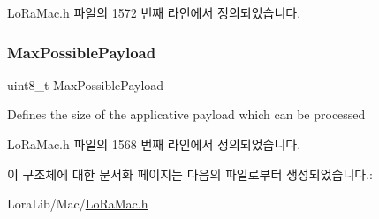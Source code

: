 Lo\+Ra\+Mac.\+h 파일의 1572 번째 라인에서 정의되었습니다.

\mbox{\label{structs_lo_ra_mac_tx_info_aa2c8329cf5f4dd8fe4b1563a40a3f642}} 
\subsubsection{\texorpdfstring{Max\+Possible\+Payload}{MaxPossiblePayload}}
{\footnotesize\ttfamily uint8\+\_\+t Max\+Possible\+Payload}

Defines the size of the applicative payload which can be processed 

Lo\+Ra\+Mac.\+h 파일의 1568 번째 라인에서 정의되었습니다.



이 구조체에 대한 문서화 페이지는 다음의 파일로부터 생성되었습니다.\+:\begin{DoxyCompactItemize}
\item 
Lora\+Lib/\+Mac/\mbox{\hyperlink{_lo_ra_mac_8h}{Lo\+Ra\+Mac.\+h}}\end{DoxyCompactItemize}
